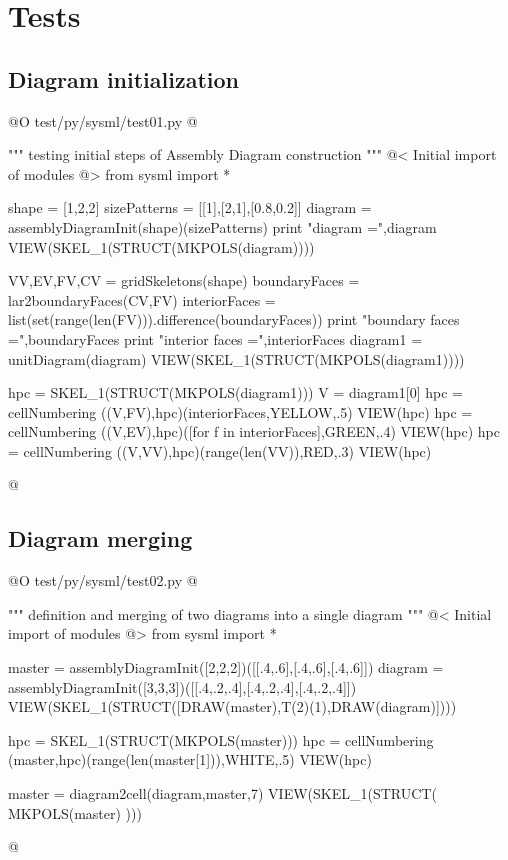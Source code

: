 \documentclass[11pt,oneside]{article}	%
\begin{document}
\section{Tests}
\subsection{Diagram initialization}

@O test/py/sysml/test01.py
@{""" testing initial steps of Assembly Diagram construction """
@< Initial import of modules @>
from sysml import *

shape = [1,2,2]
sizePatterns = [[1],[2,1],[0.8,0.2]]
diagram = assemblyDiagramInit(shape)(sizePatterns)
print "\n diagram =",diagram
VIEW(SKEL_1(STRUCT(MKPOLS(diagram))))

VV,EV,FV,CV = gridSkeletons(shape)
boundaryFaces = lar2boundaryFaces(CV,FV)
interiorFaces = list(set(range(len(FV))).difference(boundaryFaces))
print "\n boundary faces =",boundaryFaces
print "\n interior faces =",interiorFaces
diagram1 = unitDiagram(diagram)
VIEW(SKEL_1(STRUCT(MKPOLS(diagram1))))

hpc = SKEL_1(STRUCT(MKPOLS(diagram1)))
V = diagram1[0]
hpc = cellNumbering ((V,FV),hpc)(interiorFaces,YELLOW,.5)
VIEW(hpc)
hpc = cellNumbering ((V,EV),hpc)([for f in interiorFaces],GREEN,.4)
VIEW(hpc)
hpc = cellNumbering ((V,VV),hpc)(range(len(VV)),RED,.3)
VIEW(hpc)

@}

\subsection{Diagram merging}

@O test/py/sysml/test02.py
@{""" definition and merging of two diagrams into a single diagram """
@< Initial import of modules @>
from sysml import *

master = assemblyDiagramInit([2,2,2])([[.4,.6],[.4,.6],[.4,.6]])
diagram = assemblyDiagramInit([3,3,3])([[.4,.2,.4],[.4,.2,.4],[.4,.2,.4]])
VIEW(SKEL_1(STRUCT([DRAW(master),T(2)(1),DRAW(diagram)])))

hpc = SKEL_1(STRUCT(MKPOLS(master)))
hpc = cellNumbering (master,hpc)(range(len(master[1])),WHITE,.5)
VIEW(hpc)

master = diagram2cell(diagram,master,7)
VIEW(SKEL_1(STRUCT( MKPOLS(master) )))

@}
\end{document}
